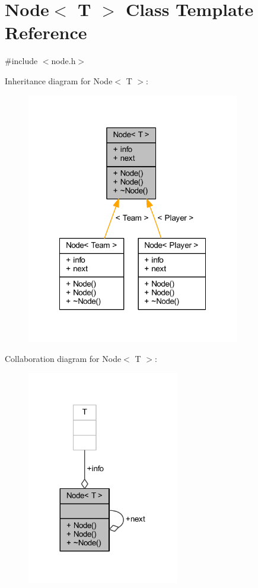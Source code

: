 \hypertarget{class_node}{}\section{Node$<$ T $>$ Class Template Reference}
\label{class_node}


{\ttfamily \#include $<$node.\+h$>$}



Inheritance diagram for Node$<$ T $>$\+:\nopagebreak
\begin{figure}[H]
\begin{center}
\leavevmode
\includegraphics[width=263pt]{d4/db9/class_node__inherit__graph}
\end{center}
\end{figure}


Collaboration diagram for Node$<$ T $>$\+:\nopagebreak
\begin{figure}[H]
\begin{center}
\leavevmode
\includegraphics[width=188pt]{d5/dbd/class_node__coll__graph}
\end{center}
\end{figure}
